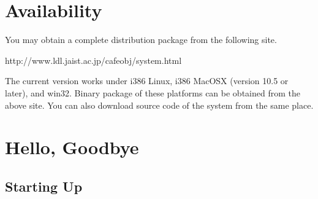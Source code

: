 \documentclass[a4paper]{memoir}
\begin{document}
\section*{Availability}

You may obtain a complete distribution package from the
following site. 
\begin{vvtm}
\begin{ccode}
  http://www.ldl.jaist.ac.jp/cafeobj/system.html
\end{ccode}
\end{vvtm}

The current version works under i386 Linux, i386 MacOSX (version 10.5
or later), and win32. Binary package of these platforms can be
obtained from the above site. You can also download source code of the
system from the same place. 


\section{Hello, Goodbye}\label{sec:p2-startup}

\subsection{Starting Up}
\end{document}
